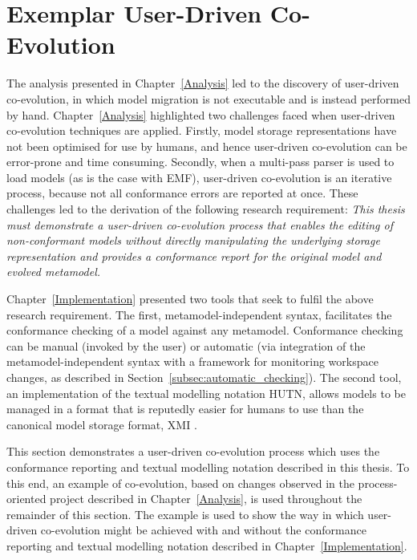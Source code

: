 
\section{Exemplar User-Driven Co-Evolution}
The analysis presented in Chapter~\ref{Analysis} led to the discovery of user-driven co-evolution, in which model migration is not executable and is instead performed by hand. Chapter~\ref{Analysis} highlighted two challenges faced when user-driven co-evolution techniques are applied. Firstly, model storage representations have not been optimised for use by humans, and hence user-driven co-evolution can be error-prone and time consuming. Secondly, when a multi-pass parser is used to load models (as is the case with EMF), user-driven co-evolution is an iterative process, because not all conformance errors are reported at once. These challenges led to the derivation of the following research requirement: \emph{This thesis must demonstrate a user-driven co-evolution process that enables the editing of non-conformant models without directly manipulating the underlying storage representation and provides a conformance report for the original model and evolved metamodel.}

Chapter~\ref{Implementation} presented two tools that seek to fulfil the above research requirement. The first, metamodel-independent syntax, facilitates the conformance checking of a model against any metamodel. Conformance checking can be manual (invoked by the user) or automatic (via integration of the metamodel-independent syntax with a framework for monitoring workspace changes, as described in Section~\ref{subsec:automatic_checking}). The second tool, an implementation of the textual modelling notation HUTN, allows models to be managed in a format that is reputedly easier for humans to use than the canonical model storage format, XMI \cite{hutn}.

This section demonstrates a user-driven co-evolution process which uses the conformance reporting and textual modelling notation described in this thesis. To this end, an example of co-evolution, based on changes observed in the process-oriented project described in Chapter~\ref{Analysis}, is used throughout the remainder of this section. The example is used to show the way in which user-driven co-evolution might be achieved with and without the conformance reporting and textual modelling notation described in Chapter~\ref{Implementation}.

